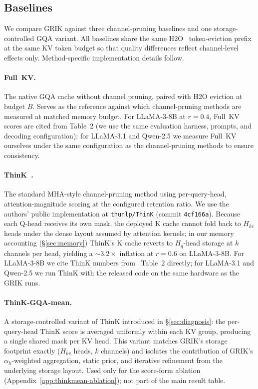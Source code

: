 \documentclass{article}
\begin{document}
\subsection{Baselines}
\label{app:expsetup-baselines}
 
We compare GRIK against three channel-pruning baselines and one storage-controlled GQA variant. All baselines share the same H2O~\citep{h2o} token-eviction prefix at the same KV token budget so that quality differences reflect channel-level effects only. Method-specific implementation details follow.
 
\paragraph{Full~KV.} The native GQA cache without channel pruning, paired with H2O eviction at budget $B$. Serves as the reference against which channel-pruning methods are measured at matched memory budget. For LLaMA-3-8B at $r{=}0.4$, Full~KV scores are cited from \citet{think} Table~2 (we use the same evaluation harness, prompts, and decoding configuration); for LLaMA-3.1 and Qwen-2.5 we measure Full~KV ourselves under the same configuration as the channel-pruning methods to ensure consistency.
 
\paragraph{ThinK~\citep{think}.} The standard MHA-style channel-pruning method using per-query-head, attention-magnitude scoring at the configured retention ratio. We use the authors' public implementation at \texttt{thunlp/ThinK} (commit \texttt{4cf166a}). Because each Q-head receives its own mask, the deployed K cache cannot fold back to $H_{kv}$ heads under the dense layout assumed by attention kernels; in our memory accounting (\S\ref{sec:memory}) ThinK's K cache reverts to $H_q$-head storage at $k$ channels per head, yielding a $\sim 3.2\times$ inflation at $r{=}0.6$ on LLaMA-3-8B. For LLaMA-3-8B we cite ThinK numbers from~\citet{think} Table~2 directly; for LLaMA-3.1 and Qwen-2.5 we run ThinK with the released code on the same hardware as the GRIK runs.
 
\paragraph{ThinK-GQA-mean.} A storage-controlled variant of ThinK introduced in \S\ref{sec:diagnosis}: the per-query-head ThinK score is averaged uniformly within each KV group, producing a single shared mask per KV head. This variant matches GRIK's storage footprint exactly ($H_{kv}$ heads, $k$ channels) and isolates the contribution of GRIK's $\alpha_h$-weighted aggregation, static prior, and iterative refinement from the underlying storage layout. Used only for the score-form ablation (Appendix~\ref{app:thinkmean-ablation}); not part of the main result table.
 
\end{document}
